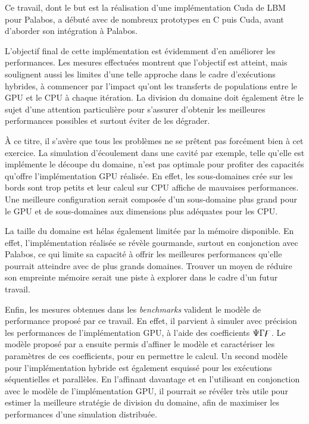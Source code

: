 Ce travail, dont le but est la réalisation d'une implémentation Cuda de \acs{LBM} pour Palabos, a débuté avec de nombreux prototypes en C puis Cuda, avant d'aborder son intégration à Palabos.

L'objectif final de cette implémentation est évidemment d'en améliorer les performances. Les mesures effectuées montrent que l'objectif est atteint, mais soulignent aussi les limites d'une telle approche dans le cadre d'exécutions hybrides, à commencer par l'impact qu'ont les transferts de populations entre le \acs{GPU} et le \acs{CPU} à chaque itération. La division du domaine doit également être le sujet d'une attention particulière pour s'assurer d'obtenir les meilleures performances possibles et surtout éviter de les dégrader.

À ce titre, il s'avère que tous les problèmes ne se prêtent pas forcément bien à cet exercice. La simulation d'écoulement dans une cavité par exemple, telle qu'elle est implémente le découpe du domaine, n'est pas optimale pour profiter des capacités qu'offre l'implémentation \acs{GPU} réalisée. En effet, les sous-domaines crée sur les bords sont trop petits et leur calcul sur \acs{CPU} affiche de mauvaises performances. Une meilleure configuration serait composée d'un sous-domaine plus grand pour le \acs{GPU} et de sous-domaines aux dimensions plus adéquates pour les \acs{CPU}.

La taille du domaine est hélas également limitée par la mémoire disponible. En effet, l'implémentation réalisée se révèle gourmande, surtout en conjonction avec Palabos, ce qui limite sa capacité à offrir les meilleures performances qu'elle pourrait atteindre avec de plus grands domaines. Trouver un moyen de réduire son empreinte mémoire serait une piste à explorer dans le cadre d'un futur travail.

Enfin, les mesures obtenues dans les \textit{benchmarks} valident le modèle de performance proposé par ce travail. En effet, il parvient à simuler avec précision les performances de l'implémentation \acs{GPU}, à l'aide des coefficients $\Psi\Gamma\digamma$. Le modèle proposé par \citet{albuquerque_performance_2012} a ensuite permis d'affiner le modèle et caractériser les paramètres de ces coefficients, pour en permettre le calcul. 
Un second modèle pour l'implémentation hybride est également esquissé pour les exécutions séquentielles et parallèles. En l'affinant davantage et en l'utilisant en conjonction avec le modèle de l'implémentation \acs{GPU}, il pourrait se révéler très utile pour estimer la meilleure stratégie de division du domaine, afin de maximiser les performances d'une simulation distribuée.